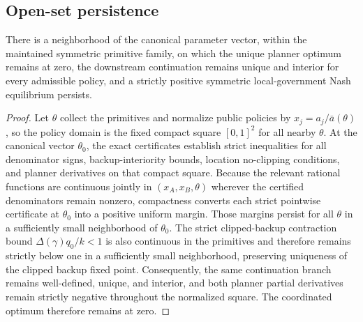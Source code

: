\subsection{Open-set persistence}

\begin{lemma}\label{lem:open-set}
There is a neighborhood of the canonical parameter vector, within the maintained symmetric primitive family, on which the unique planner optimum remains at zero, the downstream continuation remains unique and interior for every admissible policy, and a strictly positive symmetric local-government Nash equilibrium persists.
\end{lemma}

\begin{proof}
Let $\theta$ collect the primitives and normalize public policies by $x_j=a_j/\bar a(\theta)$, so the policy domain is the fixed compact square $[0,1]^2$ for all nearby $\theta$. At the canonical vector $\theta_0$, the exact certificates establish strict inequalities for all denominator signs, backup-interiority bounds, location no-clipping conditions, and planner derivatives on that compact square. Because the relevant rational functions are continuous jointly in $(x_A,x_B,\theta)$ wherever the certified denominators remain nonzero, compactness converts each strict pointwise certificate at $\theta_0$ into a positive uniform margin. Those margins persist for all $\theta$ in a sufficiently small neighborhood of $\theta_0$. The strict clipped-backup contraction bound $\Delta(\gamma)q_0/k<1$ is also continuous in the primitives and therefore remains strictly below one in a sufficiently small neighborhood, preserving uniqueness of the clipped backup fixed point. Consequently, the same continuation branch remains well-defined, unique, and interior, and both planner partial derivatives remain strictly negative throughout the normalized square. The coordinated optimum therefore remains at zero.


\end{proof}
